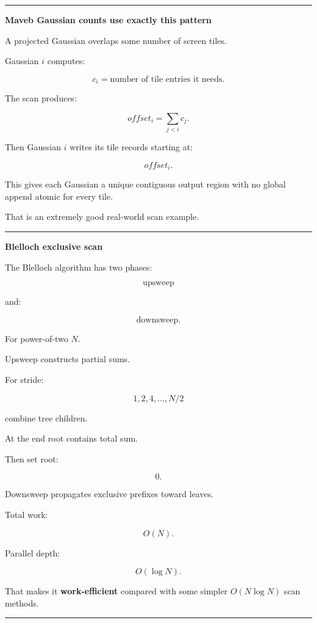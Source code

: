 \begin{center}\rule{0.5\linewidth}{0.5pt}\end{center}

\textbf{Maveb Gaussian counts use exactly this pattern}

A projected Gaussian overlaps some number of screen tiles.

Gaussian \(i\) computes:

\[
c_i=
\text{number of tile entries it needs}.
\]

The scan produces:

\[
offset_i=
\sum_{j<i}c_j.
\]

Then Gaussian \(i\) writes its tile records starting at:

\[
offset_i.
\]

This gives each Gaussian a unique contiguous output region with no global append atomic for every tile.

That is an extremely good real-world scan example.

\begin{center}\rule{0.5\linewidth}{0.5pt}\end{center}

\textbf{Blelloch exclusive scan}

The Blelloch algorithm has two phases:

\[
\boxed{
\text{upsweep}
}
\]

and:

\[
\boxed{
\text{downsweep}.
}
\]

For power-of-two \(N\).

Upsweep constructs partial sums.

For stride:

\[
1,2,4,\dots,N/2
\]

combine tree children.

At the end root contains total sum.

Then set root:

\[
0.
\]

Downsweep propagates exclusive prefixes toward leaves.

Total work:

\[
O(N).
\]

Parallel depth:

\[
O(\log N).
\]

That makes it \textbf{work-efficient} compared with some simpler \(O(N\log N)\) scan methods.

\begin{center}\rule{0.5\linewidth}{0.5pt}\end{center}

